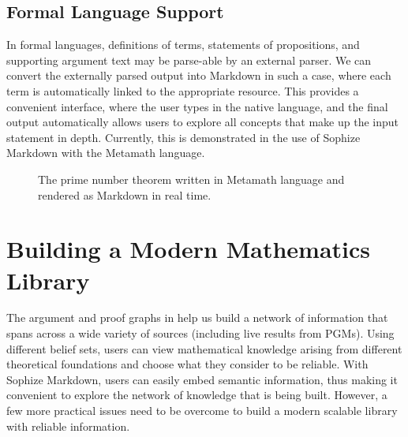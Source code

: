 \documentclass[runningheads]{llncs}
\begin{document}
\subsection{Formal Language Support}

In formal languages, definitions of terms, statements of propositions, and supporting argument text may be parse-able by an external parser. We can convert the externally parsed output into Markdown in such a case, where each term is automatically linked to the appropriate resource. This provides a convenient interface, where the user types in the native language, and the final output automatically allows users to explore all concepts that make up the input statement in depth. Currently, this is demonstrated in the use of Sophize Markdown with the Metamath language.

\begin{figure}
\begin{center}
\caption{The prime number theorem written in Metamath language and rendered as Markdown in real time.}
\label{formal}
\end{center}
\end{figure}


\section{Building a Modern Mathematics Library}
\label{sec:lib}
The argument and proof graphs in help us build a network of information that spans across a wide variety of sources (including live results from PGMs). Using different belief sets, users can view mathematical knowledge arising from different theoretical foundations and choose what they consider to be reliable. With Sophize Markdown, users can easily embed semantic information, thus making it convenient to explore the network of knowledge that is being built. However, a few more practical issues need to be overcome to build a modern scalable library with reliable information.
\end{document}
